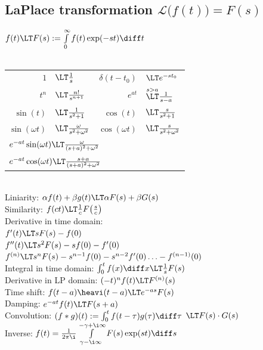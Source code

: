 \documentclass[fs, footer]{latex4ei}
\begin{document}
\begin{multicols*}{4}
{\subsection{LaPlace transformation \quad $\mathcal L\bigl(f(t)\bigr) = F(s)$}
	$f(t) \LT F(s) := \int\limits_0^\infty f(t) \exp(-st) \diff t$\\
	\\
	\everymath{\displaystyle}	%
	\begin{tabular}{rl|rl}
		$1$ & $\LT \frac{1}{s}$ & $\delta(t-t_0)$ &$\LT e^{-s t_0}$\\[0.2em]
		$t^n$ &$\LT \frac{n!}{s^{n+1}}$ & $e^{at}$  &$\overset{s > a}{ \LT } \frac{1}{s-a}$\\[0.5em] 
		$\sin(t)$ &$\LT \frac{1}{s^2 + 1}$ & $\cos(t)$ &$\LT \frac{s}{s^2 + 1}$\\[0.5em]
		$\sin(\omega t)$ &$\LT \frac{\omega}{s^2 + \omega^2}$ & $\cos(\omega t)$ &$\LT \frac{s}{s^2 + \omega^2}$\\[0.5em]
		\multicolumn{4}{l}{ $e^{-at} \sin(\omega t) \LT \frac{\omega}{(s+a)^2+\omega^2}$} \\
		\multicolumn{4}{l}{ $e^{-at} \cos(\omega t) \LT \frac{s+a}{(s+a)^2+\omega^2}$}\\ 		

	\end{tabular}\\
	\everymath{\textstyle}
	Liniarity: $\alpha f(t) + \beta g(t) \LT \alpha F(s) + \beta G(s)$\\
	Similarity: $f(ct) \LT \frac{1}{c} F\bigl(  \frac{s}{c} \bigr)$\\
	Derivative in time domain:\\
	$f'(t) \LT s F(s) - f(0)$ \\
	 $f''(t) \LT s^2 F(s) - sf(0) - f'(0)$\\
	$f^{(n)} \LT s^n F(s) - s^{n-1} f(0) - s^{n-2} f'(0) \ldots - f^{(n-1)}(0)$\\
	Integral in time domain: $\int_0^t f(x) \diff x \LT \frac{1}{s} F(s)$\\
	Derivative in LP domain: $(-t)^n f(t) \LT F^{(n)} (s)$\\
	Time shift: $f(t-a)\heavi(t-a) \LT e^{-as} F(s)$\\

	Damping: $e^{-at} f(t) \LT F(s+a)$\\
	Convolution: $(f * g)(t) := \int_0^t f( t - \tau) g(\tau) \diff \tau$ $\LT F(s) \cdot G(s)$\\
	Inverse: $f(t) = \frac{1}{2\pi \i} \int\limits_{\gamma - \i \infty}^{-\gamma + \i \infty} F(s) \exp(st) \diff s$\\
	



}
\end{multicols*}
\end{document}

